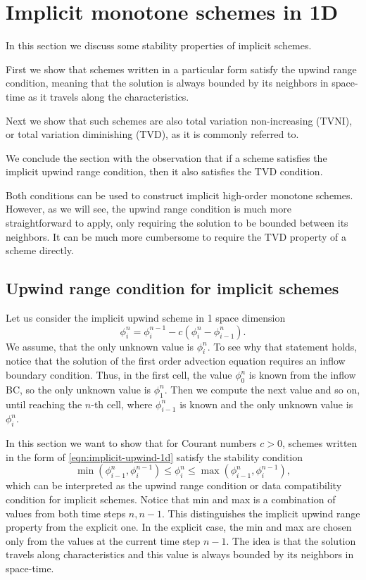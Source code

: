 \documentclass[../thesis.tex]{subfiles}
\begin{document}
\section{Implicit monotone schemes in 1D}
In this section we discuss some stability properties of implicit schemes.

First we show that schemes written in a particular form satisfy the upwind range condition, meaning that the solution is
always bounded by its neighbors in space-time
as it travels along the characteristics.

Next we show that such schemes are also total variation non-increasing (TVNI),
or total variation diminishing (TVD), as it is commonly referred to.

We conclude the section with the observation that if a scheme satisfies the
implicit upwind range condition, then it also satisfies the TVD condition.

Both conditions can be used to construct implicit high-order monotone schemes.
However, as we will see, the upwind range condition is much more straightforward to
apply, only requiring the solution to be bounded between its neighbors. It can be much more cumbersome to require the TVD property of a scheme directly.
\subsection{Upwind range condition for implicit schemes}
Let us consider the implicit upwind scheme in 1 space dimension
\begin{equation}\label{eqn:implicit-upwind-1d}
    \phi_{i}^{n} =
    \phi_{i}^{n-1} - c\left( \phi_{i}^{n} - \phi_{i-1}^{n} \right).
\end{equation}
We assume, that the only unknown value is \(\phi_{i}^{n}\).
To see why that statement holds, notice that the solution of the first order advection
equation requires an inflow boundary condition. Thus, in the first cell, the value \(\phi_{0}^{n}\) is known from the inflow BC, so the only unknown value is \(\phi_{1}^{n}\). Then we compute the next value and so on, until reaching the \(n\)-th cell, where \(\phi_{i-1}^{n}\) is known and the only unknown value is \(\phi_{i}^{n}\).

In this section we want to show that for Courant numbers \(c > 0\), schemes written
in the form of \eqref{eqn:implicit-upwind-1d} satisfy the stability condition
\begin{equation}\label{eqn:implicit-upwind-range-condition}
    \min\left( \phi_{i-1}^{n},\phi_{i}^{n-1} \right)
    \leq
    \phi_{i}^{n}\leq
    \max\left( \phi_{i-1}^{n},\phi_{i}^{n-1} \right),
\end{equation}
which can be interpreted as the upwind range condition\cite{1998_Laney_BOOK}
or data compatibility condition \cite{2009_Toro_BOOK} for implicit schemes.
Notice that min and max is a combination of values from both time steps \(n, n-1\).
This distinguishes the implicit upwind range property from the explicit one.
In the explicit case, the min and max are chosen only from the values at the current time step \(n-1\).
The idea is that the solution travels along characteristics and this value is always bounded by its neighbors in space-time.
\end{document}
